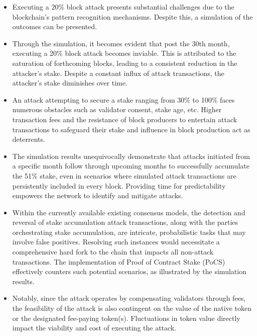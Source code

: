 \documentclass{article}
\begin{document}
\begin{itemize}
    \item Executing a 20\% block attack presents substantial challenges due to the blockchain's pattern recognition mechanisms. Despite this, a simulation of the outcomes can be presented.
    \item Through the simulation, it becomes evident that post the 30th month, executing a 20\% block attack becomes inviable. This is attributed to the saturation of forthcoming blocks, leading to a consistent reduction in the attacker's stake. Despite a constant influx of attack transactions, the attacker's stake diminishes over time.
    \item An attack attempting to secure a stake ranging from 30\% to 100\% faces numerous obstacles such as validator consent, stake age, etc. Higher transaction fees and the resistance of block producers to entertain attack transactions to safeguard their stake and influence in block production act as deterrents.
    \item The simulation results unequivocally demonstrate that attacks initiated from a specific month follow through upcoming months to successfully accumulate the 51\% stake, even in scenarios where simulated attack transactions are persistently included in every block. Providing time for predictability empowers the network to identify and mitigate attacks.
    \item Within the currently available existing consensus models, the detection and reversal of stake accumulation attack transactions, along with the parties orchestrating stake accumulation, are intricate, probabilistic tasks that may involve false positives. Resolving such instances would necessitate a comprehensive hard fork to the chain that impacts all non-attack transactions. The implementation of Proof of Contract Stake (PoCS) effectively counters such potential scenarios, as illustrated by the simulation results.
    \item Notably, since the attack operates by compensating validators through fees, the feasibility of the attack is also contingent on the value of the native token or the designated fee-paying token(s). Fluctuations in token value directly impact the viability and cost of executing the attack.
\end{itemize}
\end{document}
